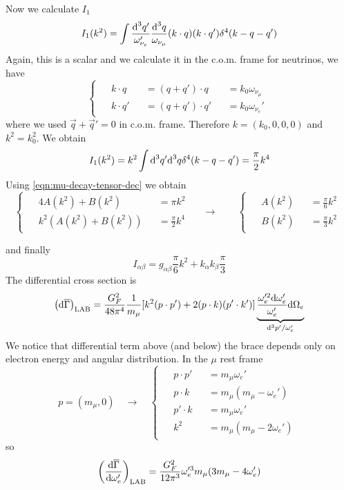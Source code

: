 \documentclass[TheoreticalPhy_ModB.tex]{subfiles}
\begin{document}
Now we calculate $I_1$
\[I_1(k^2)=\int\frac{\textup{d}^3q'}{\omega_{\nu_e}'}\frac{\textup{d}^3q}{\omega_{\nu_\mu}}(k\cdot q)(k\cdot q')\delta^4(k-q-q')\]
Again, this is a scalar and we calculate it in the c.o.m. frame for neutrinos, we have
\[\begin{cases}\begin{alignedat}{3}
&k\cdot q&&=(q+q')\cdot q&&=k_0\omega_{\nu_\mu}\\
&k\cdot q'&&=(q+q')\cdot q'&&=k_0\omega_{\nu_e}'
\end{alignedat}\end{cases}\]
where we used $\vec q+\vec q'=0$ in c.o.m. frame. Therefore $k=(k_0,0,0,0)$ and $k^2=k_0^2$. We obtain
\[I_1(k^2)=k^2\int \textup{d}^3q' \textup{d}^3q\delta^4(k-q-q')=\frac\pi2k^4\]
Using \eqref{eqn:mu-decay-tensor-dec} we obtain
\[\begin{cases}\begin{alignedat}{2}
&4A(k^2)+B(k^2)&&=\pi k^2\\
&k^2(A(k^2)+B(k^2))&&=\frac\pi2k^4
\end{alignedat}\end{cases}
\quad\to\qquad
\begin{cases}\begin{alignedat}{2}
&A(k^2)&&=\frac\pi6 k^2\\
&B(k^2)&&=\frac\pi3k^2
\end{alignedat}\end{cases}
\]

and finally 
\[I_{\alpha\beta}=g_{\alpha\beta}\frac\pi6k^2+k_\alpha k_\beta\frac\pi3\]
The differential cross section is 
\[\left(\textup{d}\overline\Gamma\right)_{\text{LAB}}
=\frac{G_F^2}{48\pi^4}\frac1{m_\mu}[k^2(p\cdot p')+2(p\cdot k)(p'\cdot k')]\underbrace{\frac{\omega_e'^2\textup{d}\omega_e'}{\omega_e'}\textup{d}\Omega_e}_{\textup{d}^3p'/\omega_e'}\]
We notice that differential term above (and below) the brace depends only on electron energy and angular distribution. In the $\mu$ rest frame
\[p=(m_\mu,0)\quad\to\quad
\begin{cases}\begin{alignedat}{2}
&p\cdot p'&&=m_\mu\omega_e'\\
&p\cdot k&&=m_\mu(m_\mu-\omega_e')\\
&p'\cdot k&&=m_\mu\omega_e'\\
&k^2&&=m_\mu(m_\mu-2\omega_e')
\end{alignedat}\end{cases}
\]
so
\[\left(\frac{\textup{d}\overline\Gamma}{\textup{d}\omega_e'}\right)_{\text{LAB}}
=\frac{G_F^2}{12\pi^3}\omega_e'^3m_\mu(3m_\mu-4\omega'_e)\]
\end{document}
